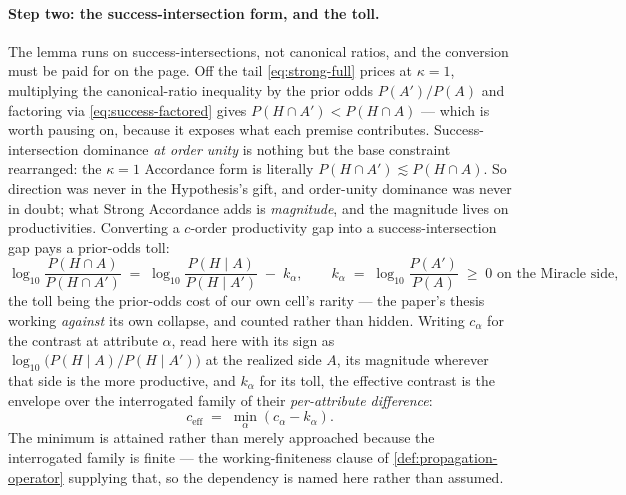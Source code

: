 \documentclass[11pt]{article}
\theoremstyle{definition}
\begin{document}
\paragraph{Step two: the success-intersection form, and the toll.} The lemma runs on success-intersections, not canonical ratios, and the conversion must be paid for on the page. Off the tail \eqref{eq:strong-full} prices at $\kappa = 1$, multiplying the canonical-ratio inequality by the prior odds $P(A')/P(A)$ and factoring via \eqref{eq:success-factored} gives $P(H \cap A') < P(H \cap A)$ --- which is worth pausing on, because it exposes what each premise contributes. Success-intersection dominance \emph{at order unity} is nothing but the base constraint rearranged: the $\kappa = 1$ Accordance form is literally $P(H \cap A') \lesssim P(H \cap A)$. So direction was never in the Hypothesis's gift, and order-unity dominance was never in doubt; what Strong Accordance adds is \emph{magnitude}, and the magnitude lives on productivities. Converting a $c$-order productivity gap into a success-intersection gap pays a prior-odds toll:
\begin{equation}
\label{eq:toll}
\log_{10} \frac{P(H \cap A)}{P(H \cap A')} \;=\; \log_{10} \frac{P(H \mid A)}{P(H \mid A')} \;-\; k_\alpha,
\qquad
k_\alpha \;=\; \log_{10} \frac{P(A')}{P(A)} \;\ge\; 0 \text{ on the Miracle side},
\end{equation}
the toll being the prior-odds cost of our own cell's rarity --- the paper's thesis working \emph{against} its own collapse, and counted rather than hidden. Writing $c_\alpha$ for the contrast at attribute $\alpha$, read here with its sign as $\log_{10}\big(P(H \mid A)/P(H \mid A')\big)$ at the realized side $A$, its magnitude wherever that side is the more productive, and $k_\alpha$ for its toll, the effective contrast is the envelope over the interrogated family of their \emph{per-attribute difference}:
\begin{equation}
\label{eq:ceff}
c_{\mathrm{eff}} \;=\; \min_{\alpha} \left( c_\alpha - k_\alpha \right).
\end{equation}
The minimum is attained rather than merely approached because the interrogated family is finite --- the working-finiteness clause of \autoref{def:propagation-operator} supplying that, so the dependency is named here rather than assumed.
\end{document}
